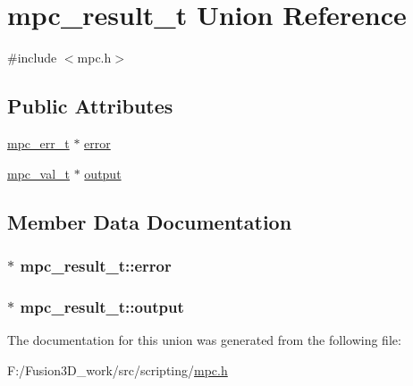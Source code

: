 \hypertarget{unionmpc__result__t}{}\section{mpc\+\_\+result\+\_\+t Union Reference}
\label{unionmpc__result__t}


{\ttfamily \#include $<$mpc.\+h$>$}

\subsection*{Public Attributes}
\begin{DoxyCompactItemize}
\item 
\hyperlink{structmpc__err__t}{mpc\+\_\+err\+\_\+t} $\ast$ \hyperlink{unionmpc__result__t_a754b4d29750f22ba378e9cbd88ac4935}{error}
\item 
\hyperlink{mpc_8h_ab6f4ea95eba71091ab18bce2a29a36e8}{mpc\+\_\+val\+\_\+t} $\ast$ \hyperlink{unionmpc__result__t_ab0cbd12be2f7de04fae2b9e1bdc4a75f}{output}
\end{DoxyCompactItemize}


\subsection{Member Data Documentation}
\hypertarget{unionmpc__result__t_a754b4d29750f22ba378e9cbd88ac4935}{}
\subsubsection[{error}]{$\ast$ mpc\+\_\+result\+\_\+t\+::error}\label{unionmpc__result__t_a754b4d29750f22ba378e9cbd88ac4935}
\hypertarget{unionmpc__result__t_ab0cbd12be2f7de04fae2b9e1bdc4a75f}{}
\subsubsection[{output}]{$\ast$ mpc\+\_\+result\+\_\+t\+::output}\label{unionmpc__result__t_ab0cbd12be2f7de04fae2b9e1bdc4a75f}


The documentation for this union was generated from the following file\+:\begin{DoxyCompactItemize}
\item 
F\+:/\+Fusion3\+D\+\_\+work/src/scripting/\hyperlink{mpc_8h}{mpc.\+h}\end{DoxyCompactItemize}
